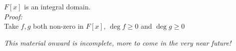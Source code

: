 \setcounter{dummy_lemma}{0}
\begin{corollary}
    $F[x]$ is an integral domain. \\ \steezybreak
    \textit{Proof:} \\ \steezybreak
    Take $f,g$ both non-zero in $F[x]$, $\deg f\geq 0$ and $\deg g \geq 0$
    
\end{corollary}
\steezybreak \textit{This material onward is incomplete, more to come in the very near future!}

